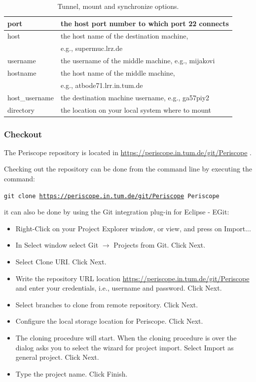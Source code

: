 \documentclass[11pt,a4paper, oneside]{book} %
\newcommand{\ptfrepo}{\url{https://periscope.in.tum.de/git/Periscope} }
\begin{document}
 \begin{table}
  \begin{center}
   \begin{tabular}{ | l | l | }
     \hline
     port           & the host port number to which port 22 connects\\ \hline
     host           & the host name of the destination machine,\\
                   & e.g., supermuc.lrz.de\\ \hline
     username       & the username of the middle machine, e.g., mijakovi\\ \hline
     hostname       & the host name of the middle machine,\\
                    & e.g., atbode71.lrr.in.tum.de\\ \hline
     host\_username & the destination machine username, e.g., ga57piy2\\ \hline
     directory      & the location on your local system where to mount\\ \hline
   \end{tabular}
  \end{center}
  \caption{Tunnel, mount and synchronize options.}\label{tab:TunnelMountOpts}
 \end{table}

\subsubsection{Checkout}

The Periscope repository is located in \ptfrepo.

Checking out the repository can be done from the command line by executing the
command:

\texttt{git clone \ptfrepo  Periscope}

it can also be done by using the Git integration plug-in for Eclipse - EGit:

 \begin{itemize}
  \item Right-Click on your Project Explorer window, or view, and press on
Import...
  \item In Select window select Git $\rightarrow$ Projects from Git. Click Next.
  \item Select Clone URI. Click Next.
  \item Write the repository URL location \ptfrepo and enter your credentials,
i.e., username and password. Click Next.
  \item Select branches to clone from remote repository. Click Next.
  \item Configure the local storage location for Periscope. Click Next.
  \item The cloning procedure will start. When the cloning procedure is over the
dialog asks you to select the wizard for project import. Select Import as general
project. Click Next.
  \item Type the project name. Click Finish.
 \end{itemize}
\end{document}
